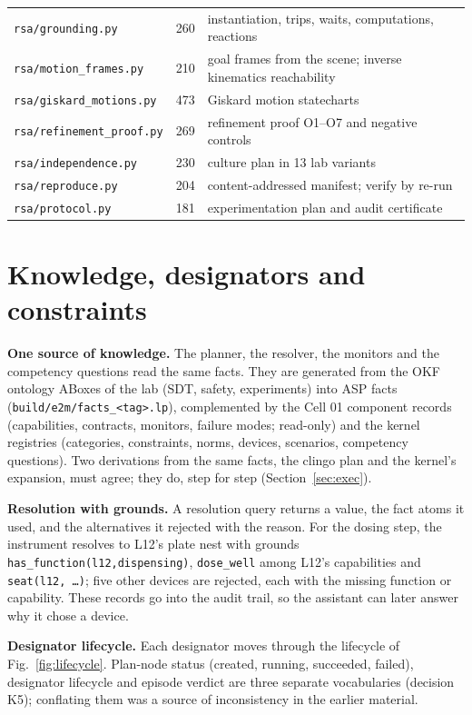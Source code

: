 \documentclass[10pt,a4paper]{article}
\begin{document}
\begin{table}[tbp]
\begin{tabularx}{\linewidth}{p{3.6cm}rX}
\texttt{rsa/grounding.py} & 260 & instantiation, trips, waits, computations, reactions \\
\texttt{rsa/motion\_\allowbreak{}frames.py} & 210 & goal frames from the scene; inverse kinematics reachability \\
\texttt{rsa/giskard\_\allowbreak{}motions.py} & 473 & Giskard motion statecharts \\
\texttt{rsa/refinement\_\allowbreak{}proof.py} & 269 & refinement proof O1–O7 and negative controls \\
\texttt{rsa/independence.py} & 230 & culture plan in 13 lab variants \\
\texttt{rsa/reproduce.py} & 204 & content-addressed manifest; verify by re-run \\
\texttt{rsa/protocol.py} & 181 & experimentation plan and audit certificate \\\bottomrule
\end{tabularx}
\end{table}

\section{Knowledge, designators and constraints}\label{sec:kb}

\textbf{One source of knowledge.} The planner, the resolver, the monitors and the competency questions read the same facts. They are generated from the OKF ontology ABoxes of the lab (SDT, safety, experiments) into ASP facts (\texttt{build/e2m/facts\_\allowbreak{}<tag>.lp}), complemented by the Cell 01 component records (capabilities, contracts, monitors, failure modes; read-only) and the kernel registries (categories, constraints, norms, devices, scenarios, competency questions). Two derivations from the same facts, the clingo plan and the kernel's expansion, must agree; they do, step for step (Section~\ref{sec:exec}).

\textbf{Resolution with grounds.} A resolution query returns a value, the fact atoms it used, and the alternatives it rejected with the reason. For the dosing step, the instrument resolves to L12's plate nest with grounds \texttt{has\_\allowbreak{}function(l12,dispensing)}, \texttt{dose\_\allowbreak{}well} among L12's capabilities and \texttt{seat(l12, …)}; five other devices are rejected, each with the missing function or capability. These records go into the audit trail, so the assistant can later answer why it chose a device.

\textbf{Designator lifecycle.} Each designator moves through the lifecycle of Fig.~\ref{fig:lifecycle}. Plan-node status (created, running, succeeded, failed), designator lifecycle and episode verdict are three separate vocabularies (decision K5); conflating them was a source of inconsistency in the earlier material.
\end{document}
